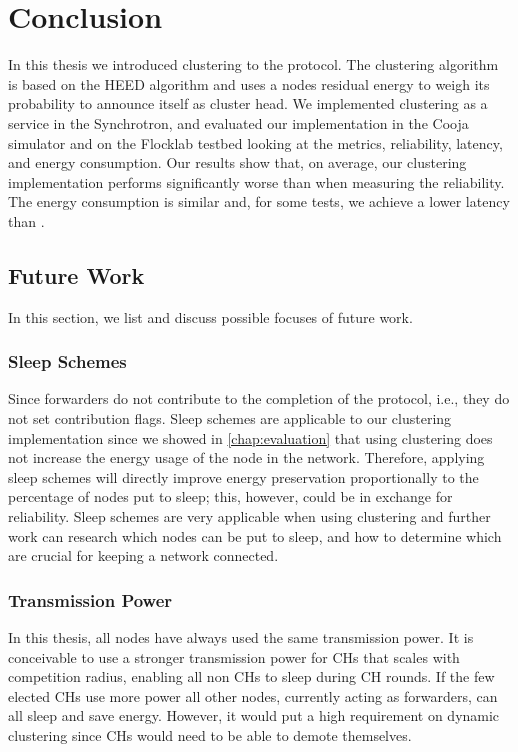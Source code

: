\chapter{Conclusion}
\label{chap:conclusion}

In this thesis we introduced clustering to the \atwo{} protocol. The clustering algorithm is based on the HEED algorithm and uses a nodes residual energy to weigh its probability to announce itself as cluster head. We implemented clustering as a service in the \atwo{} Synchrotron, and evaluated our implementation in the Cooja simulator and on the Flocklab testbed looking at the metrics, reliability, latency, and energy consumption. Our results show that, on average, our clustering implementation performs significantly worse than \atwo{} when measuring the reliability. The energy consumption is similar and, for some tests, we achieve a lower latency than \atwo{}.



\section{Future Work}
\label{sec:future-work}
In this section, we list and discuss possible focuses of future work.


\subsection{Sleep Schemes}
Since forwarders do not contribute to the completion of the protocol, i.e., they do not set contribution flags. Sleep schemes are applicable to our clustering implementation since we showed in \cref{chap:evaluation} that using clustering does not increase the energy usage of the node in the network. Therefore, applying sleep schemes will directly improve energy preservation proportionally to the percentage of nodes put to sleep; this, however, could be in exchange for reliability. Sleep schemes are very applicable when using clustering and further work can research which nodes can be put to sleep, and how to determine which are crucial for keeping a network connected.

\subsection{Transmission Power}
In this thesis, all nodes have always used the same transmission power. It is conceivable to use a stronger transmission power for CHs that scales with competition radius, enabling all non CHs to sleep during CH rounds. If the few elected CHs use more power all other nodes, currently acting as forwarders, can all sleep and save energy. However, it would put a high requirement on dynamic clustering since CHs would need to be able to demote themselves. 


